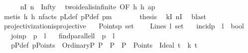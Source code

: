 \begin{isabellebody}
\ \ \ \ \isamarkupfalse%
\ nI{\isacharcolon}{\kern0pt}\ {\isachardoublequoteopen}n\ {\isacharequal}{\kern0pt}\ Infty{\isachardoublequoteclose}\ \isamarkupfalse%
\ two{\isacharunderscore}{\kern0pt}ideal{\isacharunderscore}{\kern0pt}is{\isacharunderscore}{\kern0pt}infinite\ {\isacharbrackleft}{\kern0pt}OF\ h{}\ h{}\ ap\ {\isacharunderscore}{\kern0pt}\ {\isacharunderscore}{\kern0pt}\ {\isacharunderscore}{\kern0pt}{\isacharbrackright}{\kern0pt}\ \isanewline
\ \ \ \ \isamarkupfalse%
\ {\isacharparenleft}{\kern0pt}metis\ h{}\ h{}\ n{\isacharunderscore}{\kern0pt}facts\ pLdef\ pPdef\ pm{\isacharparenright}{\kern0pt}\isanewline
\ \ \ \ \isamarkupfalse%
\ \isamarkupfalse%
\ {\isacharquery}{\kern0pt}thesis\ \isamarkupfalse%
\ kI\ nI\ \isamarkupfalse%
\ blast\isanewline
\ \ \isamarkupfalse%
\isanewline
{}\isamarkupfalse%
%
\endisatagproof
{\isafoldproof}%
%
\isadelimproof
\isanewline
%
\endisadelimproof
\isanewline
{}\isamarkupfalse%
\ projectivization{\isacharunderscore}{\kern0pt}is{\isacharunderscore}{\kern0pt}projective{\isacharcolon}{\kern0pt}\isanewline
\ \ \ Points{\isacharcolon}{\kern0pt}{\isacharcolon}{\kern0pt}{\isachardoublequoteopen}{\isacharprime}{\kern0pt}p\ set{\isachardoublequoteclose}\ \isanewline
\ \ \ Lines{\isacharcolon}{\kern0pt}{\isacharcolon}{\kern0pt}\ {\isachardoublequoteopen}{\isacharprime}{\kern0pt}l\ set{\isachardoublequoteclose}\isanewline
\ \ \ incid{\isacharcolon}{\kern0pt}{\isacharcolon}{\kern0pt}{\isachardoublequoteopen}{\isacharprime}{\kern0pt}p\ {\isasymRightarrow}\ {\isacharprime}{\kern0pt}l\ {\isasymRightarrow}\ bool{\isachardoublequoteclose}\ \isanewline
\ \ \ join{\isacharcolon}{\kern0pt}{\isacharcolon}{\kern0pt}{\isachardoublequoteopen}{\isacharprime}{\kern0pt}p\ {\isasymRightarrow}\ {\isacharprime}{\kern0pt}p\ {\isasymRightarrow}\ {\isacharprime}{\kern0pt}l{\isachardoublequoteclose}\isanewline
\ \ \ find{\isacharunderscore}{\kern0pt}parallel{\isacharcolon}{\kern0pt}{\isacharcolon}{\kern0pt}{\isachardoublequoteopen}{\isacharprime}{\kern0pt}l\ {\isasymRightarrow}\ {\isacharprime}{\kern0pt}p\ {\isasymRightarrow}\ {\isacharprime}{\kern0pt}l{\isachardoublequoteclose}\isanewline
\ \ \ pPdef{\isacharcolon}{\kern0pt}\ {\isachardoublequoteopen}pPoints\ {\isasymequiv}\ {\isacharbraceleft}{\kern0pt}OrdinaryP\ P\ {\isacharbar}{\kern0pt}\ P\ {\isachardot}{\kern0pt}\ {\isacharparenleft}{\kern0pt}P\ {\isasymin}\ Points{\isacharparenright}{\kern0pt}{\isacharbraceright}{\kern0pt}\ {\isasymunion}\ {\isacharbraceleft}{\kern0pt}Ideal\ t\ {\isacharbar}{\kern0pt}\ k\ t\ {\isachardot}{\kern0pt}\ \isanewline

\end{isabellebody}
